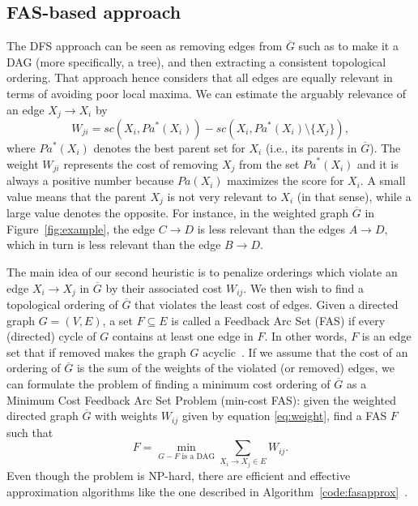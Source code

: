 \subsection{FAS-based approach}
\label{subsec:fasapproach}
The DFS approach can be seen as removing edges from $\overline G$ such as to make it a DAG (more specifically, a tree), and then extracting a consistent topological ordering. That approach hence considers that all edges are equally relevant in terms of avoiding poor local maxima. We can estimate the arguably relevance of an edge $X_j \rightarrow X_i$ by
\begin{equation}
  \label{eq:weight}
  W_{ji} = {sc}( X_i , {Pa}^*( X_i ) ) - {sc}( X_i , {Pa}^*( X_i ) \setminus \{ X_j \} ) ,
\end{equation}
where ${Pa}^*( X_i )$ denotes the best parent set for $X_i$ (i.e., its parents in $\overline G$). The weight $W_{ji}$ represents the cost of removing $X_j$ from the set ${Pa}^*( X_i )$ and it is always a positive number because ${Pa}( X_i )$ maximizes the score for $X_i$. A small value means that the parent $X_j$ is not very relevant to $X_i$ (in that sense), while a large value denotes the opposite. For instance, in the weighted graph $\overline G$ in Figure~\ref{fig:example}, the edge $C \rightarrow D$ is less relevant than the edges $A \rightarrow D$, which in turn is less relevant than the edge $B  \rightarrow D$. 

   The main idea of our second heuristic is to penalize orderings which violate an edge $X_i \rightarrow X_j$ in $\overline G$ by their associated cost $W_{ij}$. We then wish to find a topological ordering of $\overline G$ that violates the least cost of edges. Given a directed graph $G = (V,E)$, a set $F \subseteq E$ is called a Feedback Arc Set (FAS) if every (directed) cycle of $G$ contains at least one edge in $F$. In other words, $F$ is an edge set that if removed makes the graph $G$ acyclic~\cite{DF01}. If we assume that the cost of an ordering of $\overline G$ is the sum of the weights of the violated (or removed) edges, we can formulate the problem of finding a minimum cost ordering of $\overline G$ as a Minimum Cost Feedback Arc Set Problem (min-cost FAS): given the weighted directed graph $\overline{G}$ with weights $W_{ij}$ given by equation \eqref{eq:weight}, find a FAS $F$ such that
\begin{equation}
  \label{eq:mincostfas}
  F = \min_{G - F \text{ is a DAG}} \sum_{X_i \rightarrow X_j \in E} W_{ij} .
\end{equation}
Even though the problem is NP-hard, there are efficient and effective approximation algorithms like the one described in Algorithm~\ref{code:fasapprox}~\cite{DF01}.

